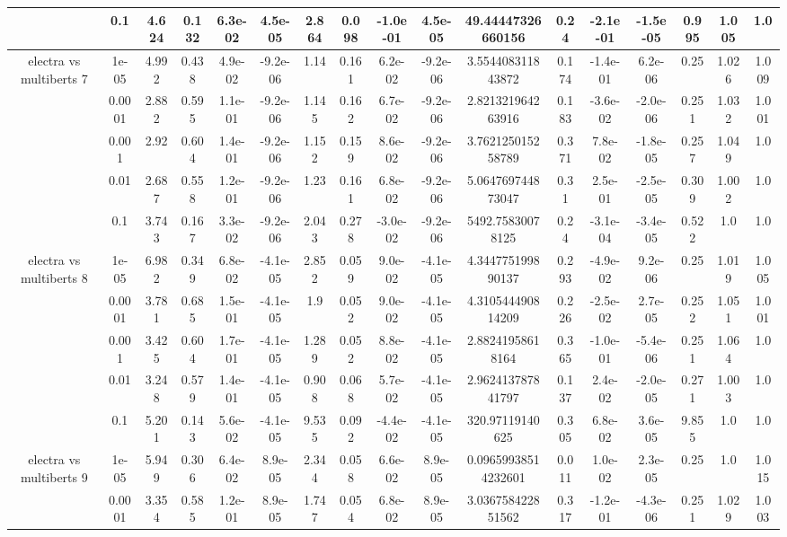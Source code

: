 \begin{tabular}{|c|c|c|c|c|c|c|c|c|c|c|c|c|c|c|c|c|}
 & 0.1 & 4.624 & 0.132 & 6.3e-02 & 4.5e-05 & 2.864 & 0.098 & -1.0e-01 & 4.5e-05 & 49.44447326660156 & 0.24 & -2.1e-01 & -1.5e-05 & 0.995 & 1.005 & 1.0 \\
\hline
\multirow{5}{*}{electra  vs multiberts 7} & 1e-05 & 4.992 & 0.438 & 4.9e-02 & -9.2e-06 & 1.14 & 0.161 & 6.2e-02 & -9.2e-06 & 3.554408311843872 & 0.174 & -1.4e-01 & 6.2e-06 & 0.25 & 1.026 & 1.009 \\
 & 0.0001 & 2.882 & 0.595 & 1.1e-01 & -9.2e-06 & 1.145 & 0.162 & 6.7e-02 & -9.2e-06 & 2.821321964263916 & 0.183 & -3.6e-02 & -2.0e-06 & 0.251 & 1.032 & 1.001 \\
 & 0.001 & 2.92 & 0.604 & 1.4e-01 & -9.2e-06 & 1.152 & 0.159 & 8.6e-02 & -9.2e-06 & 3.762125015258789 & 0.371 & 7.8e-02 & -1.8e-05 & 0.257 & 1.049 & 1.0 \\
 & 0.01 & 2.687 & 0.558 & 1.2e-01 & -9.2e-06 & 1.23 & 0.161 & 6.8e-02 & -9.2e-06 & 5.064769744873047 & 0.31 & 2.5e-01 & -2.5e-05 & 0.309 & 1.002 & 1.0 \\
 & 0.1 & 3.743 & 0.167 & 3.3e-02 & -9.2e-06 & 2.043 & 0.278 & -3.0e-02 & -9.2e-06 & 5492.75830078125 & 0.24 & -3.1e-04 & -3.4e-05 & 0.522 & 1.0 & 1.0 \\
\hline
\multirow{5}{*}{electra  vs multiberts 8} & 1e-05 & 6.982 & 0.349 & 6.8e-02 & -4.1e-05 & 2.852 & 0.059 & 9.0e-02 & -4.1e-05 & 4.344775199890137 & 0.293 & -4.9e-02 & 9.2e-06 & 0.25 & 1.019 & 1.005 \\
 & 0.0001 & 3.781 & 0.685 & 1.5e-01 & -4.1e-05 & 1.9 & 0.052 & 9.0e-02 & -4.1e-05 & 4.310544490814209 & 0.226 & -2.5e-02 & 2.7e-05 & 0.252 & 1.051 & 1.001 \\
 & 0.001 & 3.425 & 0.604 & 1.7e-01 & -4.1e-05 & 1.289 & 0.052 & 8.8e-02 & -4.1e-05 & 2.88241958618164 & 0.365 & -1.0e-01 & -5.4e-06 & 0.251 & 1.064 & 1.0 \\
 & 0.01 & 3.248 & 0.579 & 1.4e-01 & -4.1e-05 & 0.908 & 0.068 & 5.7e-02 & -4.1e-05 & 2.962413787841797 & 0.137 & 2.4e-02 & -2.0e-05 & 0.271 & 1.003 & 1.0 \\
 & 0.1 & 5.201 & 0.143 & 5.6e-02 & -4.1e-05 & 9.535 & 0.092 & -4.4e-02 & -4.1e-05 & 320.97119140625 & 0.305 & 6.8e-02 & 3.6e-05 & 9.855 & 1.0 & 1.0 \\
\hline
\multirow{5}{*}{electra  vs multiberts 9} & 1e-05 & 5.949 & 0.306 & 6.4e-02 & 8.9e-05 & 2.344 & 0.058 & 6.6e-02 & 8.9e-05 & 0.09659938514232601 & 0.011 & 1.0e-02 & 2.3e-05 & 0.25 & 1.0 & 1.015 \\
 & 0.0001 & 3.354 & 0.585 & 1.2e-01 & 8.9e-05 & 1.747 & 0.054 & 6.8e-02 & 8.9e-05 & 3.036758422851562 & 0.317 & -1.2e-01 & -4.3e-06 & 0.251 & 1.029 & 1.003 \\

\end{tabular}
